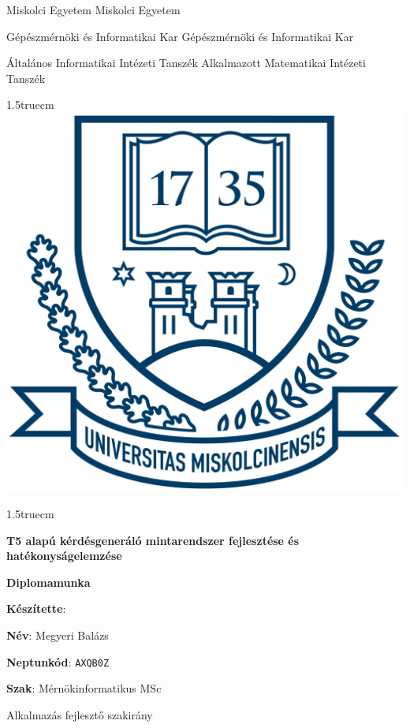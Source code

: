 \pagestyle{empty}

{\small
Miskolci Egyetem \hfill Miskolci Egyetem

Gépészmérnöki és Informatikai Kar \hfill Gépészmérnöki és Informatikai Kar

Általános Informatikai Intézeti Tanszék \hfill \hfill Alkalmazott Matematikai Intézeti Tanszék}

{\large
\begin{center}
\vglue 1.5truecm
\includegraphics[scale=0.15]{images/me_logo.png}\\
\end{center}}

\vglue 1.5truecm

{\huge
\begin{center}
\textbf{T5 alapú kérdésgeneráló mintarendszer fejlesztése és hatékonyságelemzése}
\end{center}}

\vspace*{1cm}

\begin{center}
\LARGE \textbf{Diplomamunka}
\end{center}

\vspace*{2.5truecm}

{\large
\hspace{6.5cm} \textbf{Készítette}:


\hspace{6.5cm} \textbf{Név}: Megyeri Balázs


\hspace{6.5cm} \textbf{Neptunkód}: \texttt{AXQB0Z}


\hspace{6.5cm} \textbf{Szak}: Mérnökinformatikus MSc


\hspace{6.5cm} Alkalmazás fejlesztő szakirány
}

\newpage
